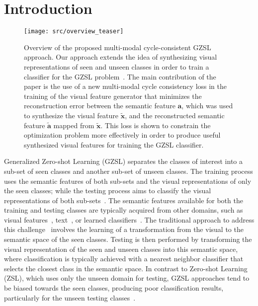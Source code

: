 \documentclass[runningheads]{llncs}
\begin{document}
\section{Introduction}

\begin{figure}[h]
\centering
\texttt{[image: src/overview\_teaser]}
\caption{Overview of the proposed multi-modal cycle-consistent GZSL approach. Our approach extends the idea of synthesizing  visual representations of seen and unseen classes in order to train a classifier for the GZSL problem~\cite{XianCVPR2018}.  The main contribution of the paper is the use of a new multi-modal cycle consistency loss in the training of the visual feature generator that 
minimizes the reconstruction error between the semantic feature $\mathbf{a}$, which was used to synthesize the visual feature $\widetilde{\mathbf{x}}$, and the reconstructed semantic feature $\widetilde{\mathbf{a}}$ mapped from $\widetilde{\mathbf{x}}$.  This loss is shown to constrain the optimization problem more effectively in order to produce useful synthesized visual features for training the GZSL classifier.}
\label{eq:cycle_teaser}

\end{figure}

\let\thefootnote\relax{}

Generalized Zero-shot Learning (GZSL) separates the classes of interest into a sub-set of seen classes and another sub-set of unseen classes.  The training process uses the semantic features of both sub-sets and the visual representations of only the seen classes; while the testing process aims to classify the visual representations of both sub-sets~\cite{XianCVPR2017,zhang2015zero}. The semantic features available for both the training and testing classes are typically acquired from other domains, such as visual features~\cite{lampert2014attribute}, text~\cite{qiao2016less,socher2013zero,zhang2015zero}, or learned classifiers~\cite{yu2013designing}. The traditional approach to address this challenge~\cite{XianCVPR2017} involves the learning of a transformation from the visual to the semantic space of the seen classes.  Testing is then performed by transforming the visual representation of the seen and unseen classes into this semantic space, where classification is typically achieved with a nearest neighbor classifier that selects the closest class in the semantic space. In contrast to Zero-shot Learning (ZSL), which uses only the unseen domain for testing, GZSL approaches tend to be biased towards the seen classes, producing poor classification results, particularly for the unseen testing classes~\cite{XianCVPR2018}. 
\end{document}
